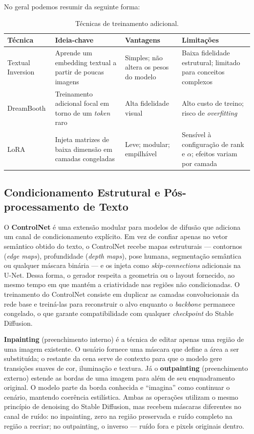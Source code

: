 \documentclass[12pt, %
openright, 
oneside, %
a4paper,    %
brazil]{facom-ufu-abntex2}
\begin{document}
No geral podemos resumir da seguinte forma:
\begin{table}[H]
    \centering
    \small
    \setlength{\tabcolsep}{4pt}
    \begin{tabularx}{\linewidth}{|l|X|X|X|}
    \hline
    \textbf{Técnica} & \textbf{Ideia-chave} & \textbf{Vantagens} & \textbf{Limitações} \\ \hline
    Textual Inversion & Aprende um embedding textual a partir de poucas imagens & Simples; não altera os pesos do modelo & Baixa fidelidade estrutural; limitado para conceitos complexos \\ \hline
    DreamBooth & Treinamento adicional focal em torno de um \textit{token} raro & Alta fidelidade visual & Alto custo de treino; risco de \textit{overfitting} \\ \hline
    LoRA & Injeta matrizes de baixa dimensão em camadas congeladas & Leve; modular; empilhável & Sensível à configuração de rank e \(\alpha\); efeitos variam por camada \\ \hline
    \end{tabularx}
    \caption{Técnicas de treinamento adicional.}
    \label{tab:tecnicas_personalizacao}
\end{table}

\subsection{Condicionamento Estrutural e Pós-processamento de Texto}

O \textbf{ControlNet} é uma extensão modular para modelos de difusão que adiciona um canal de condicionamento explícito. Em vez de confiar apenas no vetor semântico obtido do texto, o ControlNet recebe mapas estruturais — contornos (\emph{edge maps}), profundidade (\emph{depth maps}), pose humana, segmentação semântica ou qualquer máscara binária — e os injeta como \emph{skip-connections} adicionais na U-Net. Dessa forma, o gerador respeita a geometria ou o layout fornecido, ao mesmo tempo em que mantém a criatividade nas regiões não condicionadas. O treinamento do ControlNet consiste em duplicar as camadas convolucionais da rede base e treiná-las para reconstruir o alvo enquanto o \emph{backbone} permanece congelado, o que garante compatibilidade com qualquer \emph{checkpoint} do Stable Diffusion.

\textbf{Inpainting} (preenchimento interno) é a técnica de editar apenas uma região de uma imagem existente. O usuário fornece uma máscara que define a área a ser substituída; o restante da cena serve de contexto para que o modelo gere transições suaves de cor, iluminação e textura. Já o \textbf{outpainting} (preenchimento externo) estende as bordas de uma imagem para além de seu enquadramento original. O modelo parte da borda conhecida e ``imagina'' como continuar o cenário, mantendo coerência estilística. Ambas as operações utilizam o mesmo princípio de denoising do Stable Diffusion, mas recebem máscaras diferentes no canal de ruído: no inpainting, zero na região preservada e ruído completo na região a recriar; no outpainting, o inverso — ruído fora e pixels originais dentro.
\end{document}

